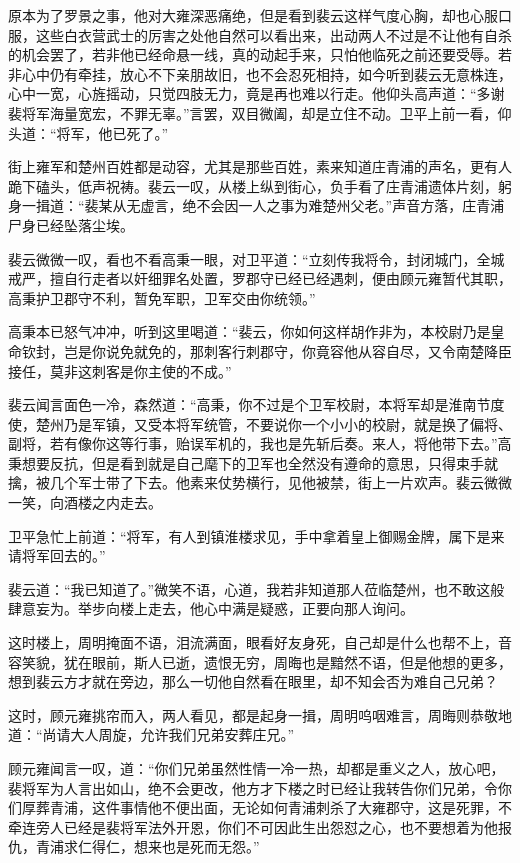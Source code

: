 原本为了罗景之事，他对大雍深恶痛绝，但是看到裴云这样气度心胸，却也心服口服，这些白衣营武士的厉害之处他自然可以看出来，出动两人不过是不让他有自杀的机会罢了，若非他已经命悬一线，真的动起手来，只怕他临死之前还要受辱。若非心中仍有牵挂，放心不下亲朋故旧，也不会忍死相持，如今听到裴云无意株连，心中一宽，心旌摇动，只觉四肢无力，竟是再也难以行走。他仰头高声道：“多谢裴将军海量宽宏，不罪无辜。”言罢，双目微阖，却是立住不动。卫平上前一看，仰头道：“将军，他已死了。”

街上雍军和楚州百姓都是动容，尤其是那些百姓，素来知道庄青浦的声名，更有人跪下磕头，低声祝祷。裴云一叹，从楼上纵到街心，负手看了庄青浦遗体片刻，躬身一揖道：“裴某从无虚言，绝不会因一人之事为难楚州父老。”声音方落，庄青浦尸身已经坠落尘埃。

裴云微微一叹，看也不看高秉一眼，对卫平道：“立刻传我将令，封闭城门，全城戒严，擅自行走者以奸细罪名处置，罗郡守已经已经遇刺，便由顾元雍暂代其职，高秉护卫郡守不利，暂免军职，卫军交由你统领。”

高秉本已怒气冲冲，听到这里喝道：“裴云，你如何这样胡作非为，本校尉乃是皇命钦封，岂是你说免就免的，那刺客行刺郡守，你竟容他从容自尽，又令南楚降臣接任，莫非这刺客是你主使的不成。”

裴云闻言面色一冷，森然道：“高秉，你不过是个卫军校尉，本将军却是淮南节度使，楚州乃是军镇，又受本将军统管，不要说你一个小小的校尉，就是换了偏将、副将，若有像你这等行事，贻误军机的，我也是先斩后奏。来人，将他带下去。”高秉想要反抗，但是看到就是自己麾下的卫军也全然没有遵命的意思，只得束手就擒，被几个军士带了下去。他素来仗势横行，见他被禁，街上一片欢声。裴云微微一笑，向酒楼之内走去。

卫平急忙上前道：“将军，有人到镇淮楼求见，手中拿着皇上御赐金牌，属下是来请将军回去的。”

裴云道：“我已知道了。”微笑不语，心道，我若非知道那人莅临楚州，也不敢这般肆意妄为。举步向楼上走去，他心中满是疑惑，正要向那人询问。

这时楼上，周明掩面不语，泪流满面，眼看好友身死，自己却是什么也帮不上，音容笑貌，犹在眼前，斯人已逝，遗恨无穷，周晦也是黯然不语，但是他想的更多，想到裴云方才就在旁边，那么一切他自然看在眼里，却不知会否为难自己兄弟？

这时，顾元雍挑帘而入，两人看见，都是起身一揖，周明呜咽难言，周晦则恭敬地道：“尚请大人周旋，允许我们兄弟安葬庄兄。”

顾元雍闻言一叹，道：“你们兄弟虽然性情一冷一热，却都是重义之人，放心吧，裴将军为人言出如山，绝不会更改，他方才下楼之时已经让我转告你们兄弟，令你们厚葬青浦，这件事情他不便出面，无论如何青浦刺杀了大雍郡守，这是死罪，不牵连旁人已经是裴将军法外开恩，你们不可因此生出怨怼之心，也不要想着为他报仇，青浦求仁得仁，想来也是死而无怨。”

